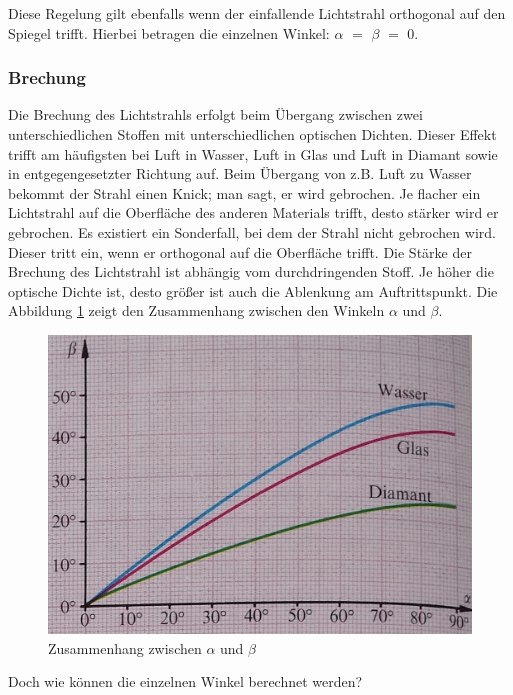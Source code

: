 Diese Regelung gilt ebenfalls wenn der einfallende Lichtstrahl orthogonal auf den Spiegel trifft. Hierbei betragen die einzelnen Winkel: $\alpha$ $=$ $\beta$ $=$ 0\degree .

\subsubsection{Brechung}
Die Brechung des Lichtstrahls erfolgt beim Übergang zwischen zwei unterschiedlichen Stoffen mit unterschiedlichen optischen Dichten. Dieser Effekt trifft am häufigsten bei Luft in Wasser, Luft in Glas und Luft in Diamant sowie in entgegengesetzter Richtung auf. Beim Übergang von z.B. Luft zu Wasser bekommt der Strahl einen Knick; man sagt, er wird gebrochen. Je flacher ein Lichtstrahl auf die Oberfläche des anderen Materials trifft, desto stärker wird er gebrochen. Es existiert ein Sonderfall, bei dem der Strahl nicht gebrochen wird. Dieser tritt ein, wenn er orthogonal auf die Oberfläche trifft. Die Stärke der Brechung des Lichtstrahl ist abhängig vom durchdringenden Stoff. Je höher die optische Dichte ist, desto größer ist auch die Ablenkung am Auftrittspunkt. Die Abbildung \ref{zsm-hang} zeigt den Zusammenhang zwischen den Winkeln $\alpha$ und $\beta$.
\begin{figure}[H]
    \centering
    \includegraphics[scale=0.3, center]{res/zusammenhang.jpg}
    \caption[Zusammenhang zwischen $\alpha$ und $\beta$]{Zusammenhang zwischen $\alpha$ und $\beta$\footnotemark}
    \label{zsm-hang}
\end{figure}

Doch wie können die einzelnen Winkel berechnet werden?\\

